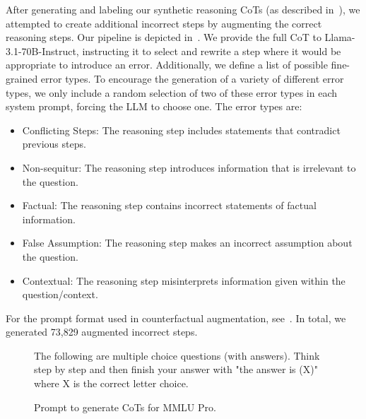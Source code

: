 After generating and labeling our synthetic reasoning CoTs (as described in~), we attempted to create additional incorrect steps by augmenting the correct reasoning steps. Our pipeline is depicted in~.
We provide the full CoT to Llama-3.1-70B-Instruct, instructing it to select and rewrite a step where it would be appropriate to introduce an error.
Additionally, we define a list of possible fine-grained error types. To encourage the generation of a variety of different error types, we only include a random selection of two of these error types in each system prompt, forcing the LLM to choose one. The error types are:
\begin{itemize}
    \item Conflicting Steps: The reasoning step includes statements that contradict previous steps.
    \item Non-sequitur: The reasoning step introduces information that is irrelevant to the question.
    \item Factual: The reasoning step contains incorrect statements of factual information.
    \item False Assumption: The reasoning step makes an incorrect assumption about the question.
    \item Contextual: The reasoning step misinterprets information given within the question/context.
\end{itemize}



For the prompt format used in counterfactual augmentation,
see~.
In total, we generated 73,829 augmented incorrect steps.


\begin{figure}[ht]
    \centering
    \begin{minipage}{6in}
    \begin{tcolorbox}[width=6in, sharp corners=all, colback=white!95!black]
    The following are multiple choice questions (with answers). Think step by step and then finish your answer with "the answer is (X)" where X is the correct letter choice.
    \end{tcolorbox}
    \end{minipage}
    \caption{Prompt to generate CoTs for MMLU Pro.}
    \label{fig:cot-gen-prompt-mmlu}
\end{figure}


